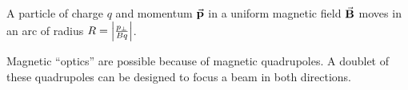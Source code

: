 \documentclass[a4paper,twoside,master.tex]{subfiles}
\begin{document}

A particle of charge $ q $ and momentum $ \va{p} $ in a uniform magnetic field $ \va{B} $ moves in an arc of radius $ R = \abs{\frac{p_{\perp}}{Bq}} $.

Magnetic ``optics'' are possible because of magnetic quadrupoles. A doublet of these quadrupoles can be designed to focus a beam in both directions.
\end{document}
